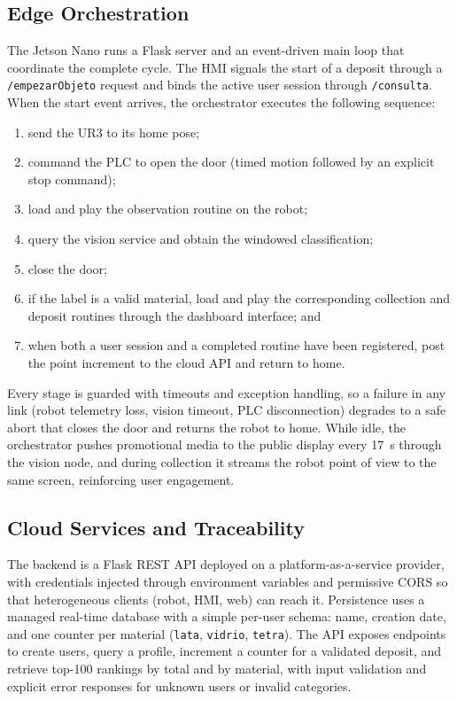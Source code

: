 \documentclass[conference]{IEEEtran}
\begin{document}
\subsection{Edge Orchestration}
The Jetson Nano runs a Flask server and an event-driven main loop that coordinate the complete cycle. The HMI signals the start of a deposit through a \texttt{/empezarObjeto} request and binds the active user session through \texttt{/consulta}. When the start event arrives, the orchestrator executes the following sequence:
\begin{enumerate}
\item send the UR3 to its home pose;
\item command the PLC to open the door (timed motion followed by an explicit stop command);
\item load and play the observation routine on the robot;
\item query the vision service and obtain the windowed classification;
\item close the door;
\item if the label is a valid material, load and play the corresponding collection and deposit routines through the dashboard interface; and
\item when both a user session and a completed routine have been registered, post the point increment to the cloud API and return to home.
\end{enumerate}
Every stage is guarded with timeouts and exception handling, so a failure in any link (robot telemetry loss, vision timeout, PLC disconnection) degrades to a safe abort that closes the door and returns the robot to home. While idle, the orchestrator pushes promotional media to the public display every 17~s through the vision node, and during collection it streams the robot point of view to the same screen, reinforcing user engagement.

\subsection{Cloud Services and Traceability}
The backend is a Flask REST API deployed on a platform-as-a-service provider, with credentials injected through environment variables and permissive CORS so that heterogeneous clients (robot, HMI, web) can reach it. Persistence uses a managed real-time database \cite{b15} with a simple per-user schema: name, creation date, and one counter per material (\texttt{lata}, \texttt{vidrio}, \texttt{tetra}). The API exposes endpoints to create users, query a profile, increment a counter for a validated deposit, and retrieve top-100 rankings by total and by material, with input validation and explicit error responses for unknown users or invalid categories.
\end{document}
